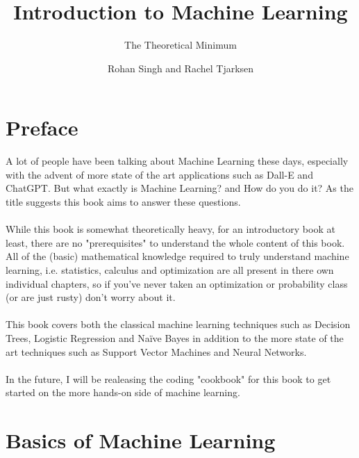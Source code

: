\documentclass[12pt, a4paper]{book}
\title{Introduction to Machine Learning}
\author{The Theoretical Minimum}
\date{Rohan Singh and Rachel Tjarksen}
\begin{document}
\maketitle

\chapter*{Preface} 
A lot of people have been talking about Machine Learning these days, especially with the advent of more state of the art applications such as Dall-E and ChatGPT. But what exactly is Machine Learning? and How do you do it? As the title suggests this book aims to answer these questions.\\\\
While this book is somewhat theoretically heavy, for an introductory book at least, there are no "prerequisites" to understand the whole content of this book. All of the (basic) mathematical knowledge required to truly understand machine learning, i.e. statistics, calculus and optimization are all present in there own individual chapters, so if you've never taken an optimization or probability class (or are just rusty) don't worry about it.\\\\
This book covers both the classical machine learning techniques such as Decision Trees, Logistic Regression and Naïve Bayes in addition to the more state of the art techniques such as Support Vector Machines and Neural Networks.\\\\
In the future, I will be realeasing the coding "cookbook" for this book to get started on the more hands-on side of machine learning.


\tableofcontents



\chapter{Basics of Machine Learning}
\end{document}
